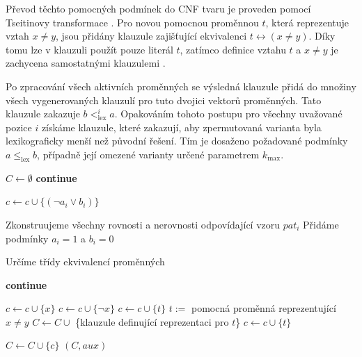 Převod těchto pomocných podmínek do CNF tvaru je proveden pomocí Tseitinovy transformace \cite{tseitin68}. Pro novou pomocnou proměnnou $t$, která reprezentuje vztah $x \neq y$, jsou přidány klauzule zajišťující ekvivalenci
$t \leftrightarrow (x \neq y)$.
Díky tomu lze v klauzuli použít pouze literál $t$, zatímco definice vztahu $t$ a $x \neq y$ je zachycena samostatnými klauzulemi \cite{tseitin68}.

Po zpracování všech aktivních proměnných se výsledná klauzule přidá do množiny všech vygenerovaných klauzulí pro tuto dvojici vektorů proměnných. Tato klauzule zakazuje $b <^i_{\mathrm{lex}} a$. Opakováním tohoto postupu pro všechny uvažované pozice $i$ získáme klauzule, které zakazují, aby zpermutovaná varianta byla lexikograficky menší než původní řešení. Tím je dosaženo požadované podmínky $a \leq_{\text{lex}} b$, případně její omezené varianty určené parametrem $k_{\max}$.


\begin{algorithm}[H]
\caption{Generování klauzulí z porovnání dvou vektorů proměnných}
\begin{algorithmic}[1]
\State $C\gets\emptyset$
\State \textbf{continue}
\EndIf

    	\State $c\gets c \cup \{(\neg a_i\vee b_i)\}$

    	\State Zkonstruujeme všechny rovnosti a nerovnosti odpovídající vzoru $pat_i$
    	\State Přidáme podmínky $a_i=1$ a $b_i=0$

    	\State Určíme třídy ekvivalencí proměnných

        	\State \textbf{continue}
    	\EndIf

            		\State $c \gets c \cup \{x\}$
            		\State  $c \gets c \cup  \{\neg x\}$
		 		\State $c \gets c \cup \{t\}$
	    		\Else
		 		\State $t :=$ pomocná proměnná reprezentující $x\neq y$
		 		\State $C \gets C \cup$ \{klauzule definující reprezentaci pro $t$\}
		 		\State $c \gets c \cup \{t\}$
	    		\EndIf
        	\EndIf
   	\EndFor

    	\State $C\gets C\cup\{c\}$
\EndFor
\State \Return $(C,aux)$

\EndFunction
\end{algorithmic}
\end{algorithm}

